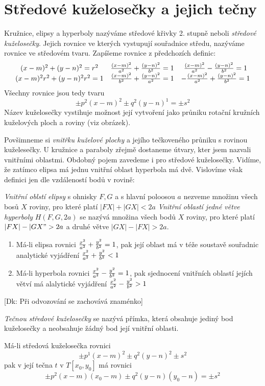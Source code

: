 
\BeginDoc{}
\section{Středové kuželosečky a jejich tečny}
\Def
Kružnice, elipsy a hyperboly nazýváme středové křivky 2. stupně neboli \emph{středové kuželosečky}.
Jejich rovnice ve  kterých vystupují souřadnice středu, nazýváme rovnice ve středovém tvaru.
\Poz
Zapíšeme rovnice z předchozích definic:
$$
\begin{array}{ccc}
	(x-m)^2 + (y-n)^2 = r^2 & \frac{(x-m)^2}{a^2}+\frac{(y-n)^2}{b^2}= 1 & \frac{(x-m)^2}{a^2}-\frac{(y-n)^2}{b^2} = 1 \\
	{(x-m)^2}{r^2} + {(y-n)^2}{r^2} = 1 & \frac{(x-m)^2}{b^2}+\frac{(y-n)^2}{a^2}= 1 & -\frac{(x-m)^2}{a^2}+\frac{(y-n)^2}{b^2} = 1 \\
\end{array}
$$
Všechny rovnice jsou tedy tvaru
$$\pm p^2(x-m)^2 \pm q^2 (y-n)^1 = \pm s^2$$
\Poz
{}
Název kuželosečky vystihuje možnost její vytvoření jako průniku rotační kružních kuželových ploch a roviny (viz obrázek).

Povšimneme si \emph{vnitřku kuželové plochy} a jejího tečkoveného průniku s rovinou kuželesečky.
U kružnice a paraboly zřejmě dostaneme útvary, kter jsem nazvali vnitřními oblastmi.
Obdobný pojem zavedeme i pro středové kuželosečky.
Vidíme, že zatímco elipsa má jednu vnitřní oblast hyperbola má dvě.
Vislovíme však definici jen dle vzdáleností bodů v rovině:

\Def
\emph{Vnitřní oblstí elipsy} s ohnisky $F,G$ a s hlavní poloosou $a$ nezveme množinu všech bosů $X$ roviny, pro které platí $|FX|+|GX| < 2a$
\Def \emph{Vnitřní oblastí jedné větve hyperboly} $H(F,G,2a)$ se nazývá množina všech bodů $X$ roviny, pro které platí $|FX|-|GX" > 2a$ a druhé větve $|GX|-|FX|>2a$.
\V
\begin{enumerate}
	\item Má-li elipsa rovnici $\frac{x^2}{a^2} + \frac{y^2}{b^2} = 1$, pak její oblast má v téže soustavě souřadnic analytické vyjádření $\frac{x^2}{a^2}+\frac{y^2}{b^2} < 1$
	\item Má-li hyperbola rovnici $\frac{x^2}{a^2}-\frac{y^2}{b^2} = 1$, pak sjednocení vnitřních oblastí jejích větví má alalytické vyjádření $\frac{x^2}{a^2}-\frac{y^2}{b^2} > 1$
\end{enumerate}
[Dk: Při odvozování se zachovává znaménko]

\Def
\emph{Tečnou středové kuželosečky} se nazývá přímka, která obsahuje jediný bod kuželosečky a neobsahuje žádný bod její vnitřní oblasti.

\V
Má-li středová kuželosečka rovnici
$$\pm p^1 (x-m)^2 \pm q^2(y-n)^2 \pm s^2$$
pak v její tečna $t$ v $T[x_0,y_0]$ má rovnici
$$\pm p^2 (x-m)(x_0-m) \pm q^2 (y-n)(y_0-n) = \pm s^2$$
\EndDoc
